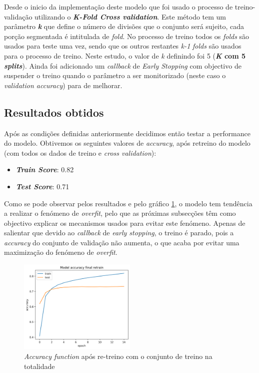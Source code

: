 Desde o inicio da implementação deste modelo que foi usado o processo de treino-validação utilizando o \textbf{\textit{K-Fold Cross validation}}. Este método tem um parâmetro \textbf{\textit{k}} que define o número de divisões que o conjunto será sujeito, cada porção segmentada é intitulada de \textit{fold}. No processo de treino todos os \textit{folds} são usados para teste uma vez, sendo que os outros restantes \textit{k-1} \textit{folds} são usados para o processo de treino. Neste estudo, o valor de \textit{k} definindo foi 5 (\textbf{\textit{K} com 5 \textit{splits}}).
Ainda foi adicionado um \textit{callback} de \textit{Early Stopping} com objectivo de suspender o treino quando o parâmetro a ser monitorizado (neste caso o \textit{validation accuracy}) para de melhorar.


\subsection{Resultados obtidos}

Após as condições definidas anteriormente decidimos então testar a performance do modelo. 
Obtivemos os seguintes valores de \textit{accuracy}, após retreino do modelo (com todos os dados de treino e \textit{cross validation}):

\begin{itemize}
        \item \textbf{\textit{Train Score}}: 0.82
        \item \textbf{\textit{Test Score}}: 0.71
\end{itemize}


Como se pode observar pelos resultados e pelo gráfico \ref{diagram:accuracy_retrain}, o modelo tem tendência a realizar o fenómeno de \textit{overfit}, pelo que as próximas subsecções têm como objectivo explicar os mecanismos usados para evitar este fenómeno. Apenas de salientar que devido ao \textit{callback} de  \textit{early stopping}, o treino é parado, pois a \textit{accuracy} do conjunto de validação não aumenta, o que acaba por evitar uma maximização do fenómeno de \textit{overfit}.


\begin{figure}[t]
\begin{center}
\includegraphics[width=0.5\textwidth,keepaspectratio]{figures/50_final_png_first.png}
\caption{\textit{Accuracy function} após re-treino com o conjunto de treino na totalidade}
\label{diagram:accuracy_retrain}
\centering
\end{center}
\end{figure}

